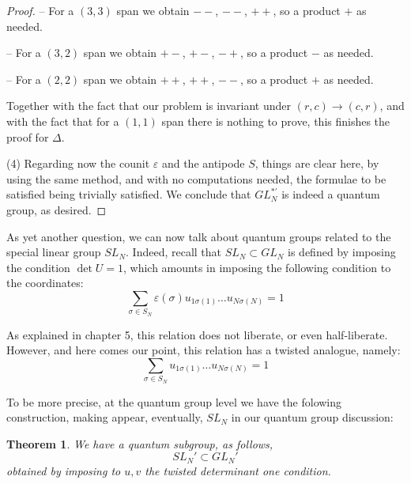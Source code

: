 \documentclass[12pt]{amsbook}
\newtheorem{theorem}{Theorem}[chapter]
\begin{document}
\begin{proof}
\smallskip

-- For a $(3,3)$ span we obtain $--$, $--$, $++$, so a product $+$ as needed.

\smallskip

-- For a $(3,2)$ span we obtain $+-$, $+-$, $-+$, so a product $-$ as needed.

\smallskip

-- For a $(2,2)$ span we obtain $++$, $++$, $--$, so a product $+$ as needed.

\medskip

Together with the fact that our problem is invariant under $(r,c)\to(c,r)$, and with the fact that for a $(1,1)$ span there is nothing to prove, this finishes the proof for $\Delta$.

\medskip

(4) Regarding now the counit $\varepsilon$ and the antipode $S$, things are clear here, by using the same method, and with no computations needed, the formulae to be satisfied being trivially satisfied. We conclude that $GL_N^{*\prime}$ is indeed a quantum group, as desired.
\end{proof}

As yet another question, we can now talk about quantum groups related to the special linear group $SL_N$. Indeed, recall that $SL_N\subset GL_N$ is defined by imposing the condition $\det U=1$, which amounts in imposing the following condition to the coordinates:
$$\sum_{\sigma\in S_N}\varepsilon(\sigma)u_{1\sigma(1)}\ldots u_{N\sigma(N)}=1$$

As explained in chapter 5, this relation does not liberate, or even half-liberate. However, and here comes our point, this relation has a twisted analogue, namely:
$$\sum_{\sigma\in S_N}u_{1\sigma(1)}\ldots u_{N\sigma(N)}=1$$

To be more precise, at the quantum group level we have the folowing construction, making appear, eventually, $SL_N$ in our quantum group discussion:

\begin{theorem}
We have a quantum subgroup, as follows,
$$SL_N'\subset GL_N'$$
obtained by imposing to $u,v$ the twisted determinant one condition.
\end{theorem}
\end{document}
